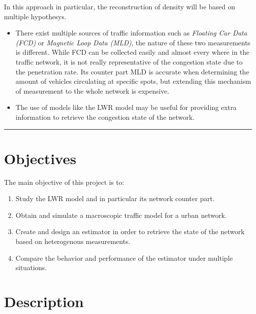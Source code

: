 \documentclass[]{book}
\providecommand{\tightlist}{%
  \setlength{\itemsep}{0pt}\setlength{\parskip}{0pt}}
\theoremstyle{definition}
\theoremstyle{definition}
\theoremstyle{definition}
\theoremstyle{remark}
\begin{document}
In this approach in particular, the reconstruction of density will be
based on multiple hypothesys.

\begin{itemize}
\tightlist
\item
  There exist multiple sources of traffic information such as
  \emph{Floating Car Data (FCD)} or \emph{Magnetic Loop Data (MLD)}, the
  nature of these two measurements is different. While FCD can be
  collected easily and almost every where in the traffic network, it is
  not really representative of the congestion state due to the
  penetration rate. Its counter part MLD is accurate when determining
  the amount of vehicles circulating at specific spots, but extending
  this mechanism of measurement to the whole network is expensive.
\item
  The use of models like the LWR model may be useful for providing extra
  information to retrieve the congestion state of the network.
\end{itemize}

\begin{center}\rule{0.5\linewidth}{\linethickness}\end{center}

\hypertarget{objectives-2}{%
\section*{Objectives}\label{objectives-2}}

The main objective of this project is to:

\begin{enumerate}
\def\labelenumi{\arabic{enumi}.}
\tightlist
\item
  Study the LWR model and in particular its network counter part.
\item
  Obtain and simulate a macroscopic traffic model for a urban network.
\item
  Create and design an estimator in order to retrieve the state of the
  network based on heterogenous measurements.
\item
  Compare the behavior and performance of the estimator under multiple
  situations.
\end{enumerate}

\hypertarget{description-2}{%
\section*{Description}\label{description-2}}
\end{document}
